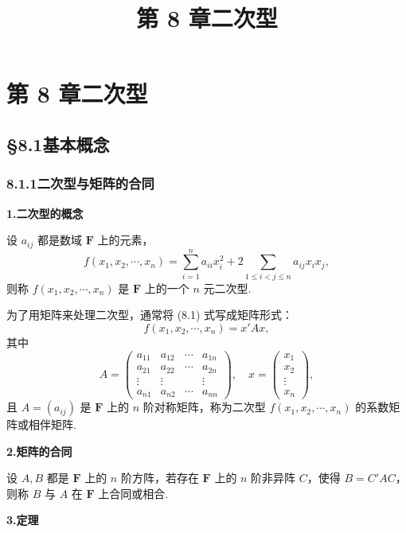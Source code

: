 \documentclass[UTF8, 12pt, fontset=fandol, oneside]{ctexart}
\title{第 8 章\quad 二次型}
\author{}
\date{}
\begin{document}
\maketitle

\section*{第 8 章\quad 二次型}

\subsection*{§8.1\quad 基本概念}

\subsubsection*{8.1.1\quad 二次型与矩阵的合同}

\noindent\textbf{1.\quad 二次型的概念}

设 $a_{ij}$ 都是数域 $\mathbf{F}$ 上的元素，
\begin{equation}
f(x_1,x_2,\cdots,x_n)=\sum_{i=1}^n a_{ii}x_i^2
+2\sum_{1\le i<j\le n}a_{ij}x_ix_j,
\tag{8.1}
\end{equation}
则称 $f(x_1,x_2,\cdots,x_n)$ 是 $\mathbf{F}$ 上的一个 $n$ 元二次型.

为了用矩阵来处理二次型，通常将 (8.1) 式写成矩阵形式：
\[
f(x_1,x_2,\cdots,x_n)=x' A x,
\]
其中
\[
A=\left(\begin{array}{cccc}
a_{11} & a_{12} & \cdots & a_{1n}\\
a_{21} & a_{22} & \cdots & a_{2n}\\
\vdots & \vdots &        & \vdots\\
a_{n1} & a_{n2} & \cdots & a_{nn}
\end{array}\right),\quad
x=\left(\begin{array}{c}
x_1\\
x_2\\
\vdots\\
x_n
\end{array}\right),
\]
且 $A=(a_{ij})$ 是 $\mathbf{F}$ 上的 $n$ 阶对称矩阵，称为二次型 $f(x_1,x_2,\cdots,x_n)$ 的系数矩阵或相伴矩阵.

\noindent\textbf{2.\quad 矩阵的合同}

设 $A,B$ 都是 $\mathbf{F}$ 上的 $n$ 阶方阵，若存在 $\mathbf{F}$ 上的 $n$ 阶非异阵 $C$，使得 $B=C'AC$，则称 $B$ 与 $A$ 在 $\mathbf{F}$ 上合同或相合.

\noindent\textbf{3.\quad 定理}
\end{document}
